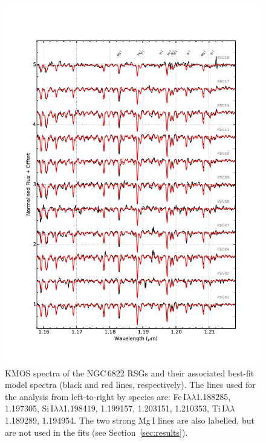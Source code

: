 \begin{figure}
 \centering
 \begin{center}
\includegraphics[width=16cm]{ngc6822/N6822_mod_fit.pdf}
\caption{KMOS spectra of the NGC\,6822 RSGs and their associated best-fit model spectra
(black and red lines, respectively).
The lines used for the analysis from left-to-right by species are:
Fe\,I$\lambda\lambda$1.188285,
1.197305,
Si\,I$\lambda\lambda$1.198419,
1.199157,
1.203151,
1.210353,
Ti\,I$\lambda\lambda$1.189289,
1.194954.
The two strong Mg\,I lines are also labelled, but are not used in the fits
(see Section~\ref{sec:results}).
         }
\label{fig:model_fits}
\end{center}
\end{figure}



